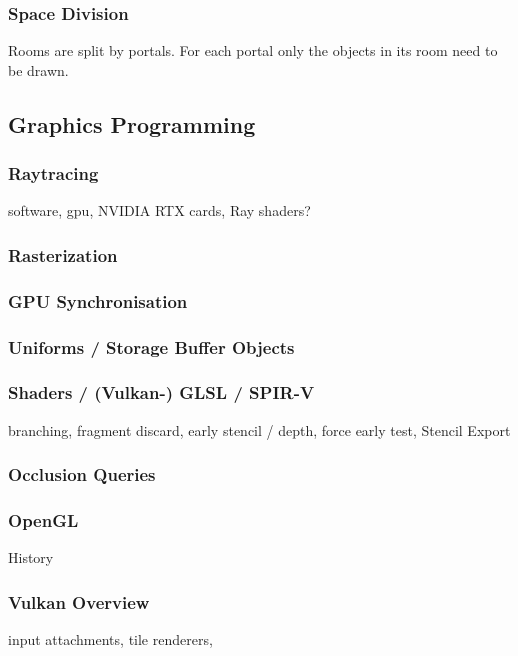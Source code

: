 \subsubsection{Space Division}
Rooms are split by portals. For each portal only the objects in its room need to be drawn.
\cite{ lowe:2005:technique}

\subsection{Graphics Programming}


\subsubsection{Raytracing}
software,
gpu,
NVIDIA RTX cards, Ray shaders?

\subsubsection{Rasterization}

\subsubsection{GPU Synchronisation}

\subsubsection{Uniforms / Storage Buffer Objects}

\subsubsection{Shaders / (Vulkan-) GLSL / SPIR-V}
branching, fragment discard, early stencil / depth, force early test, Stencil Export

\subsubsection{Occlusion Queries}

\subsubsection{OpenGL}
History

\subsubsection{Vulkan Overview}
input attachments, tile renderers,

